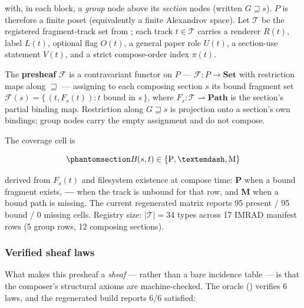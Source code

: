 \documentclass[
  english,
]{article}
\begin{document}
with, in each block, a \emph{group} node above its \emph{section} nodes
(written \(G \sqsupseteq s\)). \(P\) is therefore a finite poset
(equivalently a finite Alexandrov space). Let \(\mathcal{T}\) be the
registered fragment-track set from
; each track \(t \in \mathcal{T}\)
carries a renderer \(R(t)\), label \(L(t)\), optional flag \(O(t)\), a
general paper role \(U(t)\), a section-use statement \(V(t)\), and a
strict compose-order index \(\pi(t)\).

The \textbf{presheaf} \(\mathcal{F}\) is a contravariant functor on
\(P\) --- \(\mathcal{F}\colon P \to \mathbf{Set}\) with restriction maps
along \(\sqsupseteq\) --- assigning to each composing section \(s\) its
bound fragment set
\(\mathcal{F}(s) = \{\,(t, F_s(t)) : t \text{ bound in } s\,\}\), where
\(F_s : \mathcal{T} \rightharpoonup \mathbf{Path}\) is the section's
partial binding map. Restriction along \(G \sqsupseteq s\) is projection
onto a section's own bindings; group nodes carry the empty assignment
and do not compose.

The coverage cell is

\begin{equation}\protect\phantomsection\label{eq:coverage_cell}{
B(s,t) \in \{\mathrm{P}, \mathrm{—}, \mathrm{M}\}
}\end{equation}

derived from \(F_s(t)\) and filesystem existence at compose time:
\textbf{P} when a bound fragment exists, \textbf{---} when the track is
unbound for that row, and \textbf{M} when a bound path is missing. The
current regenerated matrix reports 95 present / 95 bound / 0 missing
cells. Registry size: \(|\mathcal{T}| = 34\) types across 17 IMRAD
manifest rows (5 group rows, 12 composing sections).

\subsubsection{Verified sheaf laws}\label{verified-sheaf-laws}

What makes this presheaf a \emph{sheaf} --- rather than a bare incidence
table --- is that the composer's structural axioms are machine-checked.
The oracle 
() verifies 6 laws, and the
regenerated build reports 6/6 satisfied:
\end{document}
